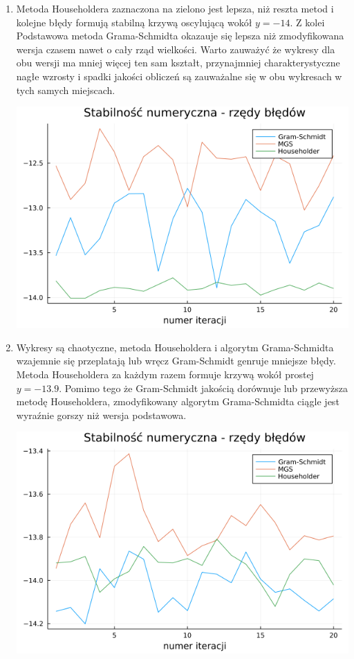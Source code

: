 \documentclass[11pt,wide]{mwart}
\begin{document}
\begin{enumerate}
    \item Metoda Householdera zaznaczona na zielono jest lepsza, niż reszta metod i kolejne błędy formują stabilną krzywą oscylującą wokół $y = -14$. Z kolei Podstawowa metoda Grama-Schmidta okazauje się lepsza niż zmodyfikowana wersja czasem nawet o cały rząd wielkości. Warto zauważyć że wykresy dla obu wersji ma mniej więcej ten sam kształt, przynajmniej charakterystyczne nagłe wzrosty i spadki jakości obliczeń są zauważalne się w obu wykresach w tych samych miejscach.
    
    \vspace{1cm}
    \centerline{\includegraphics[scale=0.6]{stability2}}
    
    \item Wykresy są chaotyczne, metoda Householdera i algorytm Grama-Schmidta wzajemnie się przeplatają lub wręcz Gram-Schmidt genruje mniejsze błędy. Metoda Householdera za każdym razem formuje krzywą wokół prostej $y = -13.9$. Pomimo tego że Gram-Schmidt jakością dorównuje lub przewyższa metodę Householdera, zmodyfikowany algorytm Grama-Schmidta ciągle jest wyraźnie gorszy niż wersja podstawowa.
    
    \vspace{1cm}
    \centerline{\includegraphics[scale=0.6]{stability1}}
    
\end{enumerate}
\end{document}
